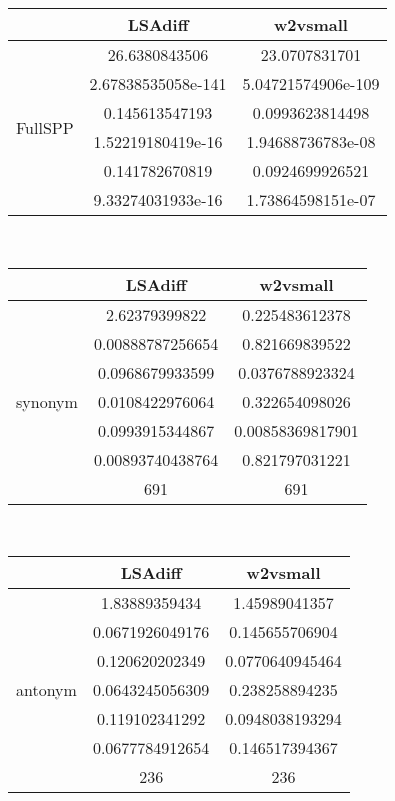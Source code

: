 \documentclass{article}
\begin{document}
\begin{tabular}{ccc|}\cline{2-3}
&\multicolumn{1}{|c}{LSAdiff} & w2vsmall \\\hline
\multicolumn{1}{|c|}{\multirow{6}{*}{FullSPP}} & 26.6380843506 & 23.0707831701 \\
\multicolumn{1}{|c|}{} & 2.67838535058e-141 & 5.04721574906e-109 \\
\multicolumn{1}{|c|}{} & 0.145613547193 & 0.0993623814498 \\
\multicolumn{1}{|c|}{} & 1.52219180419e-16 & 1.94688736783e-08 \\
\multicolumn{1}{|c|}{} & 0.141782670819 & 0.0924699926521 \\
\multicolumn{1}{|c|}{} & 9.33274031933e-16 & 1.73864598151e-07 \\
\hline
\end{tabular}\\
\begin{tabular}{ccc|}\cline{2-3}
&\multicolumn{1}{|c}{LSAdiff} & w2vsmall \\\hline
\multicolumn{1}{|c|}{\multirow{7}{*}{synonym}} & 2.62379399822 & 0.225483612378 \\
\multicolumn{1}{|c|}{} & 0.00888787256654 & 0.821669839522 \\
\multicolumn{1}{|c|}{} & 0.0968679933599 & 0.0376788923324 \\
\multicolumn{1}{|c|}{} & 0.0108422976064 & 0.322654098026 \\
\multicolumn{1}{|c|}{} & 0.0993915344867 & 0.00858369817901 \\
\multicolumn{1}{|c|}{} & 0.00893740438764 & 0.821797031221 \\
\multicolumn{1}{|c|}{} & 691 & 691 \\
\hline
\end{tabular}\\
\begin{tabular}{ccc|}\cline{2-3}
&\multicolumn{1}{|c}{LSAdiff} & w2vsmall \\\hline
\multicolumn{1}{|c|}{\multirow{7}{*}{antonym}} & 1.83889359434 & 1.45989041357 \\
\multicolumn{1}{|c|}{} & 0.0671926049176 & 0.145655706904 \\
\multicolumn{1}{|c|}{} & 0.120620202349 & 0.0770640945464 \\
\multicolumn{1}{|c|}{} & 0.0643245056309 & 0.238258894235 \\
\multicolumn{1}{|c|}{} & 0.119102341292 & 0.0948038193294 \\
\multicolumn{1}{|c|}{} & 0.0677784912654 & 0.146517394367 \\
\multicolumn{1}{|c|}{} & 236 & 236 \\
\hline
\end{tabular}\\
\end{document}
